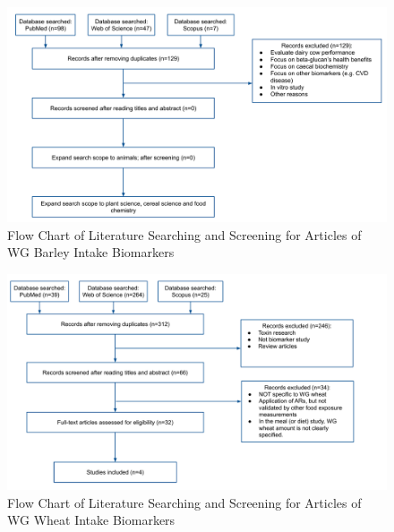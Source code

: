 \begin{figure}[h!]
	\centering
	\includegraphics[width=\linewidth]{picture/barley_biomarker_review}
	\caption{Flow Chart of Literature Searching and Screening for Articles of WG Barley Intake Biomarkers}
	\label{fig:barleybiomarkerreview}
\end{figure}

\begin{figure}[h!]
	\centering
	\includegraphics[width=\linewidth]{picture/wheat_biomarker_review}
	\caption{Flow Chart of Literature Searching and Screening for Articles of WG Wheat Intake Biomarkers}
	\label{fig:wheatbiomarkerreview}
\end{figure}


